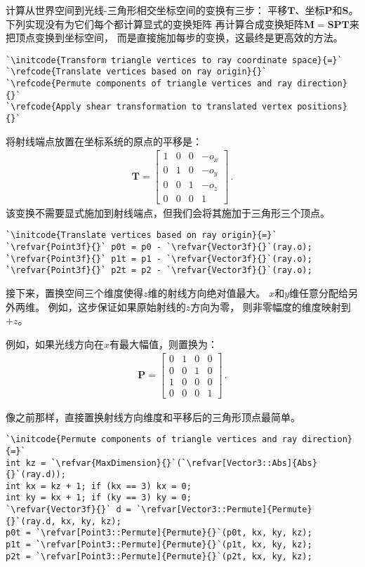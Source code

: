 计算从世界空间到光线-三角形相交坐标空间的变换有三步：
平移$\bm T$、坐标$\bm P$和$\bm S$。
下列实现没有为它们每个都计算显式的变换矩阵
再计算合成变换矩阵$\bm M=\bm S\bm P\bm T$来把顶点变换到坐标空间，
而是直接施加每步的变换，这最终是更高效的方法。
\begin{lstlisting}
`\initcode{Transform triangle vertices to ray coordinate space}{=}`
`\refcode{Translate vertices based on ray origin}{}`
`\refcode{Permute components of triangle vertices and ray direction}{}`
`\refcode{Apply shear transformation to translated vertex positions}{}`
\end{lstlisting}

将射线端点放置在坐标系统的原点的平移是：
\begin{align*}
    \bm T=\left[\begin{array}{cccc}
            1 & 0 & 0 & -o_x \\
            0 & 1 & 0 & -o_y \\
            0 & 0 & 1 & -o_z \\
            0 & 0 & 0 & 1
        \end{array}\right]\, .
\end{align*}
该变换不需要显式施加到射线端点，但我们会将其施加于三角形三个顶点。
\begin{lstlisting}
`\initcode{Translate vertices based on ray origin}{=}`
`\refvar{Point3f}{}` p0t = p0 - `\refvar{Vector3f}{}`(ray.o);
`\refvar{Point3f}{}` p1t = p1 - `\refvar{Vector3f}{}`(ray.o);
`\refvar{Point3f}{}` p2t = p2 - `\refvar{Vector3f}{}`(ray.o);
\end{lstlisting}

接下来，置换空间三个维度使得$z$维的射线方向绝对值最大。
$x$和$y$维任意分配给另外两维。
例如，这步保证如果原始射线的$z$方向为零，
则非零幅度的维度映射到$+z$。

例如，如果光线方向在$x$有最大幅值，则置换为：
\begin{align*}
    \bm P=\left[\begin{array}{cccc}
            0 & 1 & 0 & 0 \\
            0 & 0 & 1 & 0 \\
            1 & 0 & 0 & 0 \\
            0 & 0 & 0 & 1
        \end{array}\right]\, .
\end{align*}

像之前那样，直接置换射线方向维度和平移后的三角形顶点最简单。
\begin{lstlisting}
`\initcode{Permute components of triangle vertices and ray direction}{=}`
int kz = `\refvar{MaxDimension}{}`(`\refvar[Vector3::Abs]{Abs}{}`(ray.d));
int kx = kz + 1; if (kx == 3) kx = 0;
int ky = kx + 1; if (ky == 3) ky = 0;
`\refvar{Vector3f}{}` d = `\refvar[Vector3::Permute]{Permute}{}`(ray.d, kx, ky, kz);
p0t = `\refvar[Point3::Permute]{Permute}{}`(p0t, kx, ky, kz);
p1t = `\refvar[Point3::Permute]{Permute}{}`(p1t, kx, ky, kz);
p2t = `\refvar[Point3::Permute]{Permute}{}`(p2t, kx, ky, kz);
\end{lstlisting}

